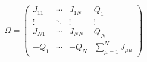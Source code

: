 \begin{equation}
\Omega= \left(
\begin{array}{cccc}
J_{11} & \cdots & J_{1N} & Q_1 \\
\vdots & \ddots & \vdots & \vdots \\
J_{N1} & \cdots & J_{NN} & Q_N  \\
-{\overline{Q}}_1 & \cdots & -{\overline{Q}}_N &  \sum_{\mu=1}^{N} J_{\mu\mu} 
\end{array} \right) 
\end{equation}

